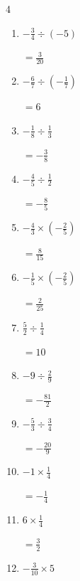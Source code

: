 \begin{multicols}{4}
\begin{enumerate}
        $\displaystyle =-\frac{7}{5}$

\columnbreak %

  \item $\displaystyle -\frac{3}{4}\div{}\left(-5\right)$

        $\displaystyle =\frac{3}{20}$

  \item $\displaystyle -\frac{6}{7}\div{}\left(-\frac{1}{7}\right)$

        $\displaystyle =6$

  \item $\displaystyle -\frac{1}{8}\div{}\frac{1}{3}$

        $\displaystyle =-\frac{3}{8}$

  \item $\displaystyle -\frac{4}{5}\div{}\frac{1}{2}$

        $\displaystyle =-\frac{8}{5}$

  \item $\displaystyle -\frac{4}{3}\times{}\left(-\frac{2}{5}\right)$

        $\displaystyle =\frac{8}{15}$

  \item $\displaystyle -\frac{1}{5}\times{}\left(-\frac{2}{5}\right)$

        $\displaystyle =\frac{2}{25}$

  \item $\displaystyle \frac{5}{2}\div{}\frac{1}{4}$

        $\displaystyle =10$

  \item $\displaystyle -9\div{}\frac{2}{9}$

        $\displaystyle =-\frac{81}{2}$

  \item $\displaystyle -\frac{5}{3}\div{}\frac{3}{4}$

        $\displaystyle =-\frac{20}{9}$

  \item $\displaystyle -1\times{}\frac{1}{4}$

        $\displaystyle =-\frac{1}{4}$

\columnbreak %

  \item $\displaystyle 6\times{}\frac{1}{4}$

        $\displaystyle =\frac{3}{2}$

  \item $\displaystyle -\frac{3}{10}\times{}5$


\end{enumerate}
\end{multicols}
